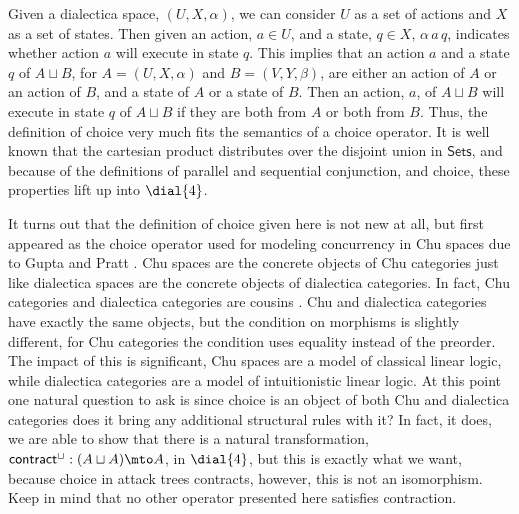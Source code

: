 Given a dialectica space, $(U, X, \alpha)$, we can consider $U$ as a
set of actions and $X$ as a set of states.  Then given an action, $a
\in U$, and a state, $q \in X$, $\alpha\,a\,q$, indicates whether
action $a$ will execute in state $q$.  This implies that an action $a$
and a state $q$ of $A \sqcup B$, for $A = (U , X , \alpha)$ and $B =
(V , Y , \beta)$, are either an action of $A$ or an action of $B$, and
a state of $A$ or a state of $B$.  Then an action, $a$, of $A \sqcup
B$ will execute in state $q$ of $A \sqcup B$ if they are both from $A$
or both from $B$.  Thus, the definition of choice very much fits the
semantics of a choice operator.  It is well known that the cartesian
product distributes over the disjoint union in $\mathsf{Sets}$, and
because of the definitions of parallel and sequential conjunction, and
choice, these properties lift up into $\dial{4}$.

It turns out that the definition of choice given here is not new at
all, but first appeared as the choice operator used for modeling
concurrency in Chu spaces due to Gupta and Pratt \cite{Gupta:1994}.
Chu spaces are the concrete objects of Chu categories just like
dialectica spaces are the concrete objects of dialectica categories.
In fact, Chu categories and dialectica categories are cousins
\cite{dePaiva:2006b}.  Chu and dialectica categories have exactly the
same objects, but the condition on morphisms is slightly different,
for Chu categories the condition uses equality instead of the
preorder.  The impact of this is significant, Chu spaces are a model
of classical linear logic, while dialectica categories are a model of
intuitionistic linear logic.  At this point one natural question to
ask is since choice is an object of both Chu and dialectica categories
does it bring any additional structural rules with it?  In fact, it
does, we are able to show that there is a natural transformation,
$\mathsf{contract}^\sqcup : (A \sqcup A) \mto A$, in $\dial{4}$, but
this is exactly what we want, because choice in attack trees
contracts, however, this is not an isomorphism.  Keep in mind that no
other operator presented here satisfies contraction.

